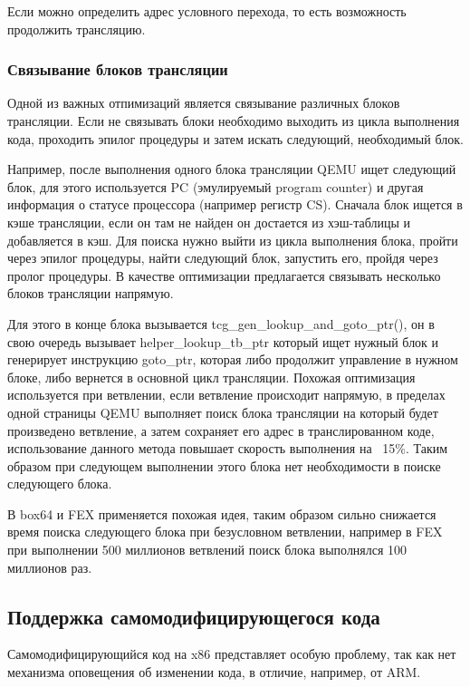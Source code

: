 Если можно определить адрес условного перехода, то есть возможность продолжить трансляцию. \cite{fex_front}

\subsubsection{Связывание блоков трансляции}

Одной из важных отпимизаций является связывание различных блоков трансляции. Если не связывать блоки необходимо выходить из цикла выполнения кода, проходить эпилог процедуры и затем искать следующий, необходимый блок.

Например, после выполнения одного блока трансляции QEMU ищет следующий блок, для этого используется PC (эмулируемый program counter) и другая информация о статусе процессора (например регистр CS). Сначала блок ищется в кэше трансляции, если он там не найден он достается из хэш-таблицы и добавляется в кэш. Для поиска нужно выйти из цикла выполнения блока, пройти через эпилог процедуры, найти следующий блок, запустить его, пройдя через пролог процедуры. В качестве оптимизации предлагается связывать несколько блоков трансляции напрямую.

Для этого в конце блока вызывается tcg\_gen\_lookup\_and\_goto\_ptr(), он в свою очередь вызывает helper\_lookup\_tb\_ptr который ищет нужный блок и генерирует инструкцию goto\_ptr, которая либо продолжит управление в нужном блоке, либо вернется в основной цикл трансляции. Похожая оптимизация используется при ветвлении, если ветвление происходит напрямую, в пределах одной страницы QEMU выполняет поиск блока трансляции на который будет произведено ветвление, а затем сохраняет его адрес в транслированном коде, использование данного метода повышает скорость выполнения на ~15\%. Таким образом при следующем выполнении этого блока нет необходимости в поиске следующего блока. \cite{qemu_docs}

В box64 и FEX применяется похожая идея, таким образом сильно снижается время поиска следующего блока при безусловном ветвлении, например в FEX при выполнении 500 миллионов ветвлений поиск блока выполнялся 100 миллионов раз. \cite{fex_video}

\subsection{Поддержка самомодифицирующегося кода}

Самомодифицирующийся код на x86 представляет особую проблему, так как нет механизма оповещения об изменении кода, в отличие, например, от ARM.

